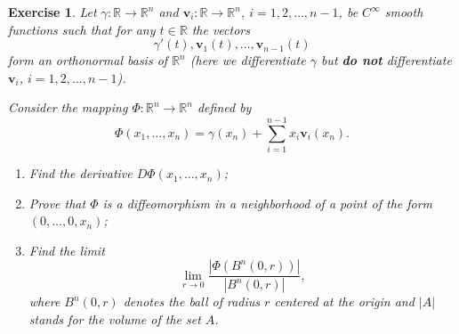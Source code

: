 \documentclass[11pt]{article}
\newtheorem{exercise}{Exercise}[section]
\theoremstyle{definition}
\numberwithin{equation}{subsection}
\begin{document}
\begin{exercise}
Let $\gamma:\mathbb{R}\to\mathbb{R}^n$ and $\mathbf{v}_i:\mathbb{R}\to\mathbb{R}^n$, $i=1,2,\ldots,n-1$, be $C^\infty$ smooth functions such that
for any $t\in\mathbb{R}$ the vectors
$$
\gamma'(t),\mathbf{v}_1(t),\ldots,\mathbf{v}_{n-1}(t)
$$
form an orthonormal basis of $\mathbb{R}^n$ (here we differentiate $\gamma$ but {\bf do not} differentiate $\mathbf{v}_i$, $i=1,2,\ldots,n-1$).

Consider the mapping $\Phi:\mathbb{R}^n\to\mathbb{R}^n$ defined by
$$
\Phi(x_1,\ldots,x_n)=\gamma(x_n)+\sum_{i=1}^{n-1} x_i\mathbf{v}_i(x_n).
$$
\begin{enumerate}[label=(\alph*)]
    \item Find the derivative $D\Phi(x_1,\ldots,x_n)$;
    
    \item Prove that $\Phi$ is a diffeomorphism in a neighborhood of a point of the form $(0,\ldots,0,x_n)$;
    
    \item Find the limit
	$$ \lim_{r\to 0} \frac{|\Phi(B^n(0,r))|}{|B^n(0,r)|},$$
	where $B^n(0,r)$ denotes the ball of radius $r$ centered at the origin and $|A|$ stands for the volume of the set $A$.
\end{enumerate}
\end{exercise}
\end{document}
